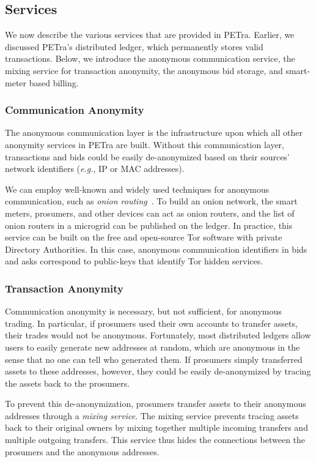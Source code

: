\subsection{Services}

We now describe the various services that are provided in PETra.
Earlier, we discussed PETra's distributed ledger, which permanently
stores valid transactions.  Below, we introduce the anonymous
communication service, the mixing service for transaction anonymity,
the anonymous bid storage, and smart-meter based billing.

\subsubsection{Communication Anonymity}
The anonymous communication layer is the infrastructure upon which all
other anonymity services in PETra are built.  Without this communication
layer, transactions and bids could be easily de-anonymized based on
their sources' network identifiers (\emph{e.g.}, IP or MAC addresses).

We can employ well-known and widely used techniques for anonymous
communication, such as \emph{onion routing}~\cite{reed1998anonymous}.
To build an onion network, the smart meters, prosumers, and other
devices can act as onion routers, and the list of onion routers in a
microgrid can be published on the ledger.  In practice, this service
can be built on the free and open-source Tor software with private
Directory Authorities.  In this case, anonymous communication
identifiers in bids and asks correspond to public-keys that identify
Tor hidden services.

\subsubsection{Transaction Anonymity}
Communication anonymity is necessary, but not sufficient, for
anonymous trading. In particular, if prosumers used their own accounts
to transfer assets, their trades would not be anonymous.  Fortunately,
most distributed ledgers allow users to easily generate new addresses
at random, which are anonymous in the sense that no one can tell who
generated them.  If prosumers simply transferred assets to these
addresses, however, they could be easily de-anonymized by tracing the
assets back to the prosumers.

To prevent this de-anonymization, prosumers transfer assets to their
anonymous addresses through a \emph{mixing service}.  The mixing
service prevents tracing assets back to their original owners by
mixing together multiple incoming transfers and multiple outgoing
transfers. This service thus hides the connections between the
prosumers and the anonymous addresses.

